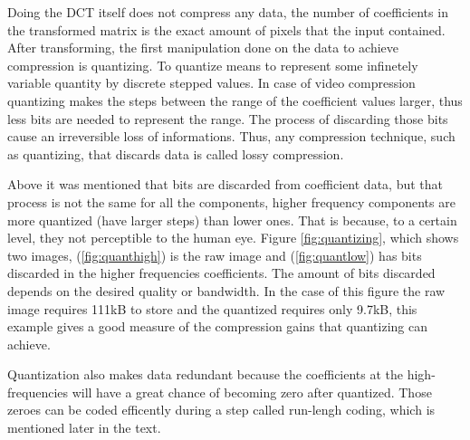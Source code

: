 \documentclass[a4paper, 12pt]{article}
\begin{document}
	Doing the DCT itself does not compress any data, the number of coefficients in the transformed matrix is the exact amount of pixels that the input contained. After transforming, the first manipulation done on the data to achieve compression is quantizing. To quantize means to represent some infinetely variable quantity by discrete stepped values. In case of video compression quantizing makes the steps between the range of the coefficient values larger, thus less bits are needed to represent the range. The process of discarding those bits cause an irreversible loss of informations. Thus, any compression technique, such as quantizing, that discards data is called lossy compression.
	
	Above it was mentioned that bits are discarded from coefficient data, but that process is not the same for all the components, higher frequency components are more quantized (have larger steps) than lower ones. That is because, to a certain level, they not perceptible to the human eye. Figure \ref{fig:quantizing}, which shows two images, (\ref{fig:quanthigh}) is the raw image and (\ref{fig:quantlow}) has bits discarded in the higher frequencies coefficients. The amount of bits discarded depends on the desired quality or bandwidth. In the case of this figure the raw image requires 111kB to store and the quantized requires only 9.7kB, this example gives a good measure of the compression gains that quantizing can achieve.

	Quantization also makes data redundant because the coefficients at the high-frequencies will have a great chance of becoming zero after quantized. Those zeroes can be coded efficently during a step called run-lengh coding, which is mentioned later in the text.
\end{document}
